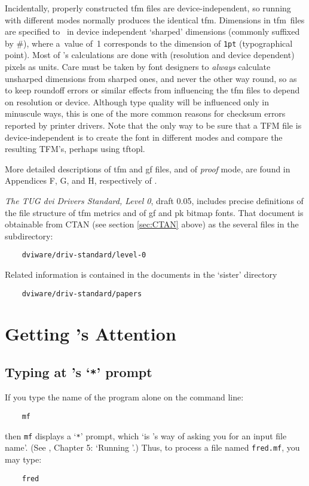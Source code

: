 Incidentally, properly constructed {\sc tfm} files are
device-independent, so running \MF{} with different modes normally
produces the identical {\sc tfm}.
Dimensions in {\sc tfm}~files are specified to~\MF{} in device
independent `sharped' dimensions (commonly suffixed by \#), where
a~value of~1 corresponds to the dimension of {\tt 1pt} (typographical
point).  Most of \MF{}'s calculations are done with (resolution and
device dependent) pixels as units.  Care must be taken by font
designers to {\em always\/} calculate unsharped dimensions from sharped
ones, and never the other way round, so as to keep roundoff errors or
similar effects from influencing the {\sc tfm} files to depend on
resolution or device.  Although type quality will be influenced only in
minuscule ways, this is one of the more common reasons for checksum
errors reported by printer drivers.
Note that the only way to be sure that a TFM file is device-independent
is to create the font in different modes and compare the resulting
TFM's, perhaps using {\sf tftopl}.

More detailed descriptions of {\sc tfm} and {\sc gf} files, and of
{\em proof\/} mode, are found in Appendices F, G, and H, respectively
of \MFbook{}.

{\sl The TUG {\sc dvi} Drivers Standard, Level 0}, draft 0.05, includes
precise definitions of the file structure of {\sc tfm} metrics and of
{\sc gf} and {\sc pk} bitmap fonts.
That document is obtainable from CTAN (see section \ref{sec:CTAN}
above) as the several files in the subdirectory:
\begin{verbatim}
    dviware/driv-standard/level-0
\end{verbatim}
Related information is contained in the documents in the `sister'
directory
\begin{verbatim}
    dviware/driv-standard/papers
\end{verbatim}


\section{Getting \MF{}'s Attention}\label{sec:typing}


\subsection{Typing at \MF{}'s `{\tt **}' prompt}\label{sub:starstar}

If you type the name of the \MF{} program alone on the command line:
\begin{verbatim}
    mf
\end{verbatim}
then {\tt mf} displays a `{\tt **}' prompt,
which
`is \MF{}'s way of asking you for an input file name'.
(See \MFbook{}, Chapter 5: `Running \MF{}'.)
Thus, to process a \MF{} file named {\tt fred.mf}, you may type:
\begin{verbatim}
    fred
\end{verbatim}

